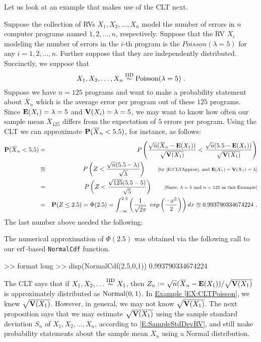 Let us look at an example that makes use of the CLT next.
\begin{example}\label{EX:CLTPoisson}
Suppose the collection of RVs $X_1,X_2, \ldots, X_n$ model the number of errors in $n$ computer programs named $1,2,\ldots,n$, respectively.  Suppose that the RV $X_i$ modeling the number of errors in the $i$-th program is the $Poisson(\lambda=5)$ for any $i=1,2,\ldots,n$.  Further suppose that they are independently distributed.  Succinctly, we suppose that 
\[
X_1,X_2,\ldots,X_n \overset{{\rm IID}}{\sim} \mbox{{\rm Poisson}}(\lambda=5) \ . 
\]
Suppose we have $n=125$ programs and want to make a probability statement about $\overline{X}_n$ which is the average error per program out of these $125$ programs.  Since $\mathbf{E}(X_i) = \lambda=5$ and $\mathbf{V}(X_i)=\lambda=5$, we may want to know how often our sample mean $\overline{X}_{125}$ differs from the expectation of $5$ errors per program.  Using the CLT we can approximate $\mathbf{P}(\overline{X}_n < 5.5)$, for instance, as follows:
\begin{eqnarray}
\mathbf{P}(\overline{X}_n < 5.5) 
&=& P \left( \frac{\sqrt{n}(\overline{X}_n - \mathbf{E}(X_1))}{\sqrt{\mathbf{V}(X_1)}} < \frac{\sqrt{n}(5.5-\mathbf{E}(X_1))}{\sqrt{\mathbf{V}(X_1)}} \right) \notag \\
&\approxeq& P \left( Z < \frac{\sqrt{n}(5.5-\lambda)}{\sqrt{\lambda}} \right) \qquad \text{{\scriptsize [by \eqref{E:CLTApprox}, and $\mathbf{E}(X_1)=\mathbf{V}(X_1)=\lambda$]}} \notag \\
&=& P \left( Z < \frac{\sqrt{125}(5.5-5)}{\sqrt{5}} \right) \qquad \text{{\scriptsize [Since, $\lambda=5$ and $n=125$ in this Example]}} \notag \\
&=& \mathbf{P}(Z \leq 2.5) = \Phi(2.5) =  \int_{- \infty}^{2.5} \left( \frac{1}{\sqrt{2 \pi}} \ \exp \left( \frac{-x^2}{2} \right) \right) dx \approxeq 0.993790334674224 \ . \notag
\end{eqnarray}
The last number above needed the following:
\begin{labwork}
The numerical approximation of $\Phi(2.5)$ was obtained via the following call to our $\operatorname{erf}$-based {\tt NormalCdf} function. %
\begin{VrbM}
>> format long
>> disp(NormalCdf(2.5,0,1))
   0.993790334674224
\end{VrbM}
\end{labwork}
\end{example}
The CLT says that if $X_1,X_2,\ldots \overset{{\rm IID}}{\sim} X_1$, then $Z_n := \sqrt{n}(\overline{X}_n-\mathbf{E}(X_1))/\sqrt{\mathbf{V}(X_1)}$ is approximately distributed as $\mbox{{\rm Normal}}(0,1)$.  In \hyperref[EX:CLTPoisson]{Example \ref*{EX:CLTPoisson}}, we knew $\sqrt{\mathbf{V}(X_1)}$.   However, in general, we may not know $\sqrt{\mathbf{V}(X_1)}$.  The next proposition says that we may estimate $\sqrt{\mathbf{V}(X_1)}$ using the sample standard deviation $S_n$ of $X_1,X_2,\ldots,X_n$, according to \eqref{E:SampleStdDevRV}, and still make probability statements about the sample mean $\overline{X}_n$ using a Normal distribution.
